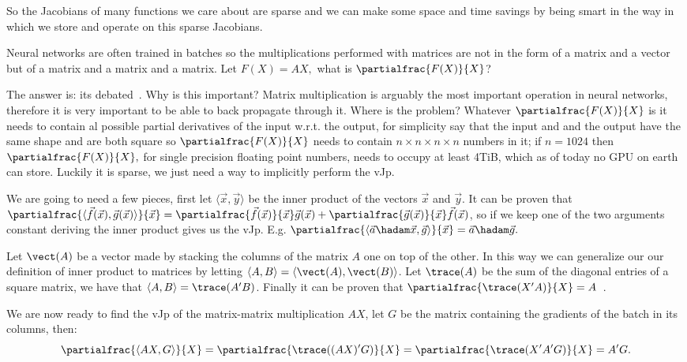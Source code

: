 \documentclass{article}
\begin{document}
So the Jacobians of many functions we care about are sparse and we can make some
space and time savings by being smart in the way in which we store and operate
on this sparse Jacobians.

Neural networks are often trained in batches so the multiplications performed
with matrices are not in the form of a matrix and a vector but of a matrix and
a matrix and a matrix. Let \(F(X) = AX,\) what is \(\partialfrac{F(X)}{X}\)?

The answer is: its debated~\cite{notion}. Why is this important? Matrix
multiplication is arguably the most important operation in neural networks,
therefore it is very important to be able to back propagate through it. Where
is the problem? Whatever \(\partialfrac{F(X)}{X}\) is it needs to contain al
possible partial derivatives of the input w.r.t. the output, for simplicity say
that the input and and the output have the same shape and are both square so
\(\partialfrac{F(X)}{X}\) needs to contain \(n \times n \times n \times n\)
numbers in it; if \(n=1024\) then \(\partialfrac{F(X)}{X},\) for single
precision floating point numbers, needs to occupy at least 4TiB, which as of
today no GPU on earth can store. Luckily it is sparse, we just need a way to
implicitly perform the vJp.

We are going to need a few pieces, first let \(\langle\vec x,\vec y\rangle\) be
the inner product of the vectors \(\vec x\) and \(\vec y.\) It can be proven
that \(\partialfrac{\langle\vec f(\vec x),\vec g(\vec x)\rangle}{\vec x}
= \partialfrac{\vec f(\vec x)}{\vec x} \vec g(\vec x)
	+ \partialfrac{\vec g(\vec x)}{\vec x} \vec f(\vec x)\), so if we keep one
of the two arguments constant deriving the inner product gives us the vJp. E.g.
\(\partialfrac{\langle\vec a \hadam \vec x,\vec g\rangle}{\vec x}
= \vec a \hadam \vec g.\)

Let \(\vect(A)\) be a vector made by stacking the columns of the matrix \(A\)
one on top of the other. In this way we can generalize our our definition of
inner product to matrices by letting \(\langle A,B\rangle =
\langle\vect(A),\vect(B)\rangle\). Let \(\trace(A)\) be the sum of the diagonal
entries of a square matrix, we have that \(\langle A,B\rangle = \trace(A'B)\).
Finally it can be proven that \(\partialfrac{\trace(X'A)}{X} =
A\)~\cite{cookbook,magnus}.

We are now ready to find the vJp of the matrix-matrix multiplication \(A X\),
let \(G\) be the matrix containing the gradients of the batch in its columns,
then: \[
\partialfrac{\langle AX,G\rangle}{X}
= \partialfrac{\trace((AX)'G)}{X}
= \partialfrac{\trace(X'A'G)}{X}
= A'G.\]
\end{document}

